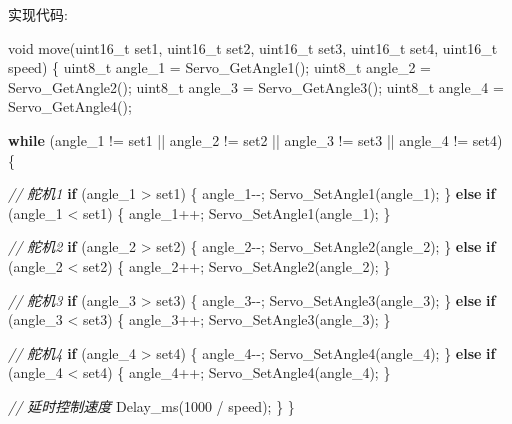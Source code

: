 \documentclass[
]{article}
\newenvironment{Shaded}{}{}
\newcommand{\CommentTok}[1]{\textcolor[rgb]{0.38,0.63,0.69}{\textit{#1}}}
\newcommand{\ControlFlowTok}[1]{\textcolor[rgb]{0.00,0.44,0.13}{\textbf{#1}}}
\newcommand{\DataTypeTok}[1]{\textcolor[rgb]{0.56,0.13,0.00}{#1}}
\newcommand{\DecValTok}[1]{\textcolor[rgb]{0.25,0.63,0.44}{#1}}
\newcommand{\NormalTok}[1]{#1}
\begin{document}
实现代码:

\begin{Shaded}
\begin{Highlighting}[]
\DataTypeTok{void}\NormalTok{ move(}\DataTypeTok{uint16\_t}\NormalTok{ set1, }\DataTypeTok{uint16\_t}\NormalTok{ set2, }\DataTypeTok{uint16\_t}\NormalTok{ set3, }\DataTypeTok{uint16\_t}\NormalTok{ set4, }\DataTypeTok{uint16\_t}\NormalTok{ speed)}
\NormalTok{\{}
    \DataTypeTok{uint8\_t}\NormalTok{ angle\_1 = Servo\_GetAngle1();}
    \DataTypeTok{uint8\_t}\NormalTok{ angle\_2 = Servo\_GetAngle2();}
    \DataTypeTok{uint8\_t}\NormalTok{ angle\_3 = Servo\_GetAngle3();}
    \DataTypeTok{uint8\_t}\NormalTok{ angle\_4 = Servo\_GetAngle4();}
    
    \ControlFlowTok{while}\NormalTok{ (angle\_1 != set1 || angle\_2 != set2 || }
\NormalTok{           angle\_3 != set3 || angle\_4 != set4) \{}
        
        \CommentTok{// 舵机1}
        \ControlFlowTok{if}\NormalTok{ (angle\_1 \textgreater{} set1) \{}
\NormalTok{            angle\_1{-}{-};}
\NormalTok{            Servo\_SetAngle1(angle\_1);}
\NormalTok{        \} }\ControlFlowTok{else} \ControlFlowTok{if}\NormalTok{ (angle\_1 \textless{} set1) \{}
\NormalTok{            angle\_1++;}
\NormalTok{            Servo\_SetAngle1(angle\_1);}
\NormalTok{        \}}
        
        \CommentTok{// 舵机2}
        \ControlFlowTok{if}\NormalTok{ (angle\_2 \textgreater{} set2) \{}
\NormalTok{            angle\_2{-}{-};}
\NormalTok{            Servo\_SetAngle2(angle\_2);}
\NormalTok{        \} }\ControlFlowTok{else} \ControlFlowTok{if}\NormalTok{ (angle\_2 \textless{} set2) \{}
\NormalTok{            angle\_2++;}
\NormalTok{            Servo\_SetAngle2(angle\_2);}
\NormalTok{        \}}
        
        \CommentTok{// 舵机3}
        \ControlFlowTok{if}\NormalTok{ (angle\_3 \textgreater{} set3) \{}
\NormalTok{            angle\_3{-}{-};}
\NormalTok{            Servo\_SetAngle3(angle\_3);}
\NormalTok{        \} }\ControlFlowTok{else} \ControlFlowTok{if}\NormalTok{ (angle\_3 \textless{} set3) \{}
\NormalTok{            angle\_3++;}
\NormalTok{            Servo\_SetAngle3(angle\_3);}
\NormalTok{        \}}
        
        \CommentTok{// 舵机4}
        \ControlFlowTok{if}\NormalTok{ (angle\_4 \textgreater{} set4) \{}
\NormalTok{            angle\_4{-}{-};}
\NormalTok{            Servo\_SetAngle4(angle\_4);}
\NormalTok{        \} }\ControlFlowTok{else} \ControlFlowTok{if}\NormalTok{ (angle\_4 \textless{} set4) \{}
\NormalTok{            angle\_4++;}
\NormalTok{            Servo\_SetAngle4(angle\_4);}
\NormalTok{        \}}
        
        \CommentTok{// 延时控制速度}
\NormalTok{        Delay\_ms(}\DecValTok{1000}\NormalTok{ / speed);}
\NormalTok{    \}}
\NormalTok{\}}
\end{Highlighting}
\end{Shaded}
\end{document}
